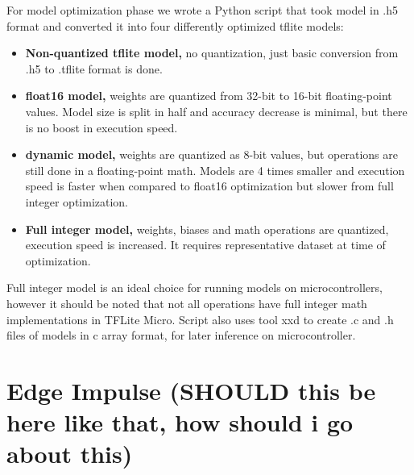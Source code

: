 For model optimization phase we wrote a Python script that took model in .h5 format and converted it into four differently optimized tflite models:
\begin{itemize}
    \item \textbf{Non-quantized tflite model,} no quantization, just basic conversion from .h5 to .tflite format is done.
    \item \textbf{float16 model,} weights are quantized from 32-bit to 16-bit floating-point values. Model size is split in half and accuracy decrease is minimal, but there is no boost in execution speed.
    \item \textbf{dynamic model,} weights are quantized as 8-bit values, but operations are still done in a floating-point math. Models are 4 times smaller and execution speed is faster when compared to float16 optimization but slower from full integer optimization.
    \item \textbf{Full integer model,} weights, biases and math operations are quantized, execution speed is increased. It requires representative dataset at time of optimization.
\end{itemize}

Full integer model is an ideal choice for running models on microcontrollers, however it should be noted that not all operations have full integer math implementations in TFLite Micro.
Script also uses tool xxd to create .c and .h files of models in c array format, for later inference on microcontroller.

\section{ Edge Impulse (SHOULD this be here like that, how should i go about this)}
